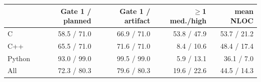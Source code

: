 \begin{tabular}{@{}lrrrr@{}}
\toprule
& Gate 1 / planned & Gate 1 / artifact & $\geq$1 med./high & mean NLOC \\
\midrule
C & 58.5 / 71.0 & 66.9 / 71.0 & 53.8 / 47.9 & 53.7 / 21.2 \\
C++ & 65.5 / 71.0 & 71.6 / 71.0 & 8.4 / 10.6 & 48.4 / 17.4 \\
Python & 93.0 / 99.0 & 99.5 / 99.0 & 5.9 / 13.1 & 36.1 / 7.0 \\
\midrule
All & 72.3 / 80.3 & 79.6 / 80.3 & 19.6 / 22.6 & 44.5 / 14.3 \\
\bottomrule
\end{tabular}
